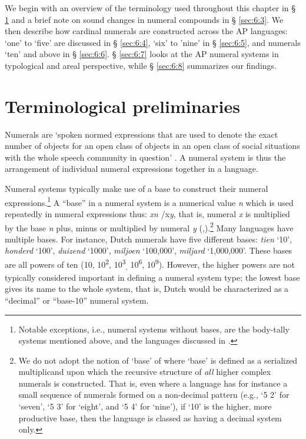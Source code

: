 We begin with an overview of the terminology used throughout this chapter in {\S} \ref{sec:6:2} and a brief note on sound changes in numeral compounds in {\S} \ref{sec:6:3}. We then describe how cardinal numerals are constructed across the AP languages: `one' to `five' are discussed in {\S} \ref{sec:6:4}, `six' to 'nine' in {\S} \ref{sec:6:5}, and numerals `ten' and above in {\S} \ref{sec:6:6}. {\S} \ref{sec:6:7} looks at the AP numeral systems in typological and areal perspective, while {\S} \ref{sec:6:8} summarizes our findings.

\section{Terminological preliminaries}\label{sec:6:2}
Numerals are `spoken normed expressions that are used to denote the exact number of objects for an open class of objects in an open class of social situations with the whole speech community in question' \citep[11]{Hammarstrom2010}. A numeral system is thus the arrangement of individual numeral expressions together in a language.

Numeral systems typically make use of a base to construct their numeral expressions.\footnote{Notable exceptions, i.e., numeral systems without bases, are the body-tally systems mentioned above, and the languages discussed in \citet[17-22]{Hammarstrom2010}.} A ``base'' in a numeral system is a numerical value \textit{n} which is used repeatedly in numeral expressions thus: \textit{xn {\textpm}}/x\textit{y}, that is, numeral \textit{x} is multiplied by the base \textit{n} plus, minus or multiplied by numeral \textit{y} (\citealt{Comrie2005numbase},\citealt[15]{Hammarstrom2010}).\footnote{We
 do not adopt the notion of `base' of \citet{Greenberg1978} where `base' is defined as a serialized multiplicand upon which the recursive structure of \textit{all} higher complex numerals is constructed. That is, even where a language has for instance a small sequence of numerals formed on a non-decimal pattern (e.g., `5 2' for `seven', `5 3' for `eight', and `5 4' for `nine'),  if `10' is the higher, more productive base, then the language is classed as having a decimal system only.
}  
Many languages have multiple bases. For instance, Dutch numerals have five different bases: \textit{tien} `10', \textit{honderd} `100', \textit{duizend} `1000', \textit{miljoen} `100,000', \textit{miljard} `1,000,000'. These bases are all powers of ten (10, 10\textsuperscript{2}, 10\textsuperscript{3}\textsubscript{,} 10\textsuperscript{6}, 10\textsuperscript{9}). However, the higher powers are not typically considered important in defining a numeral system type; the lowest base gives its name to the whole system, that is, Dutch would be characterized as a ``decimal'' or ``base-10'' numeral system. 

